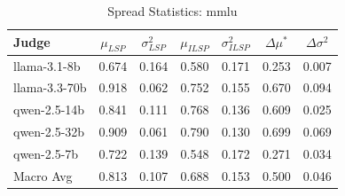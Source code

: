\begin{table}[h]
\centering
\caption{Spread Statistics: mmlu}
\label{tab:spread_mmlu}
\begin{tabular}{l c c c c c c}
\hline
Judge & $\mu_{LSP}$ & $\sigma^2_{LSP}$ & $\mu_{ILSP}$ & $\sigma^2_{ILSP}$ & $\Delta\mu^*$ & $\Delta\sigma^2$ \\
\hline
llama-3.1-8b & 0.674 & 0.164 & 0.580 & 0.171 & 0.253 & 0.007 \\
llama-3.3-70b & 0.918 & 0.062 & 0.752 & 0.155 & 0.670 & 0.094 \\
qwen-2.5-14b & 0.841 & 0.111 & 0.768 & 0.136 & 0.609 & 0.025 \\
qwen-2.5-32b & 0.909 & 0.061 & 0.790 & 0.130 & 0.699 & 0.069 \\
qwen-2.5-7b & 0.722 & 0.139 & 0.548 & 0.172 & 0.271 & 0.034 \\
\hline
Macro Avg & 0.813 & 0.107 & 0.688 & 0.153 & 0.500 & 0.046 \\
\hline
\end{tabular}
\end{table}